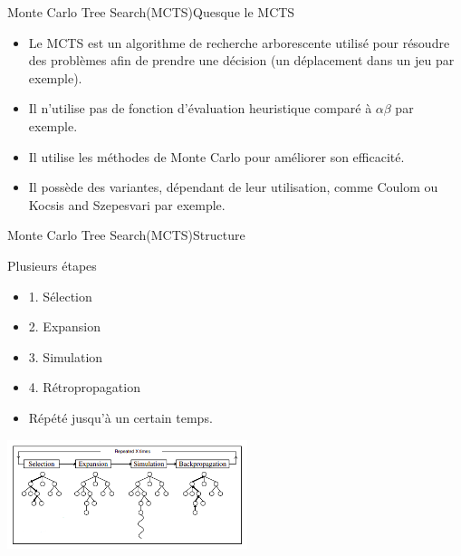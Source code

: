\begin{frame}{Monte Carlo Tree Search(MCTS)}{Quesque le MCTS}
	\begin{block}{}
		\begin{itemize}
			\item Le MCTS est un algorithme de recherche arborescente utilisé pour résoudre des problèmes afin de prendre une décision (un déplacement dans un jeu par exemple).
			\item Il n'utilise pas de fonction d'évaluation heuristique comparé à $\alpha$$\beta$ par exemple.
			\item Il utilise les méthodes de Monte Carlo pour améliorer son efficacité.
			\item Il possède des variantes, dépendant de leur utilisation, comme Coulom ou Kocsis and Szepesvari par exemple.
			
		\end{itemize}
	\end{block}
\end{frame}

\begin{frame}{Monte Carlo Tree Search(MCTS)}{Structure}
    \begin{block}{Plusieurs étapes}
	    	\begin{itemize}
	    		\item 1. Sélection
	    		\item 2. Expansion
	    		\item 3. Simulation
	    		\item 4. Rétropropagation
	    		\item Répété jusqu'à un certain temps.
	    	\end{itemize}
	\end{block}
	\begin{block}{}
		\begin{center}
			\includegraphics[width=7cm]{ressources/MCTSEtapes}
		\end{center}
	\end{block}
\end{frame}